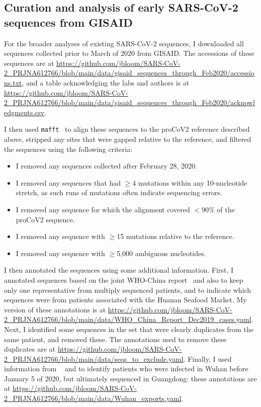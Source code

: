 \documentclass[9pt,twocolumn,twoside]{gsajnl_modified}
\begin{document}
{\subsection{Curation and analysis of early SARS-CoV-2 sequences from GISAID}
For the broader analyses of existing SARS-CoV-2 sequences, I downloaded all sequences collected prior to March of 2020 from GISAID.
The accessions of these sequences are at \url{https://github.com/jbloom/SARS-CoV-2_PRJNA612766/blob/main/data/gisaid_sequences_through_Feb2020/accessions.txt}, and a table acknowledging the labs and authors is at \url{https://github.com/jbloom/SARS-CoV-2_PRJNA612766/blob/main/data/gisaid_sequences_through_Feb2020/acknowledgments.csv}.

I then used \texttt{mafft}~\citep{katoh2013mafft} to align these sequences to the proCoV2 reference described above, stripped any sites that were gapped relative to the reference, and filtered the sequences using the following criteria:
\begin{itemize}
\item I removed any sequences collected after February 28, 2020.
\item I removed any sequences that had $\ge$4 mutations within any 10-nucleotide stretch, as such runs of mutations often indicate sequencing errors.
\item I removed any sequence for which the alignment covered $<$90\% of the proCoV2 sequence.
\item I removed any sequence with $\ge$15 mutations relative to the reference.
\item I removed any sequence with $\ge$5,000 ambiguous nucleotides.
\end{itemize}

I then annotated the sequences using some additional information.
First, I annotated sequences based on the joint WHO-China report~\citep{WHO2021origins} and also \citet{zhu2020brief} to keep only one representative from multiply sequenced patients, and to indicate which sequences were from patients associated with the Huanan Seafood Market.
My version of these annotations is at \url{https://github.com/jbloom/SARS-CoV-2_PRJNA612766/blob/main/data/WHO_China_Report_Dec2019_cases.yaml}.
Next, I identified some sequences in the set that were clearly duplicates from the same patient, and removed these.
The annotations used to remove these duplicates are at \url{https://github.com/jbloom/SARS-CoV-2_PRJNA612766/blob/main/data/seqs_to_exclude.yaml}.
Finally, I used information from ~\citet{chan2020familial} and \citet{kang2020evidence} to identify patients who were infected in Wuhan before January 5 of 2020, but ultimately sequenced in Guangdong: these annotations are at \url{https://github.com/jbloom/SARS-CoV-2_PRJNA612766/blob/main/data/Wuhan_exports.yaml}.

}
\end{document}
